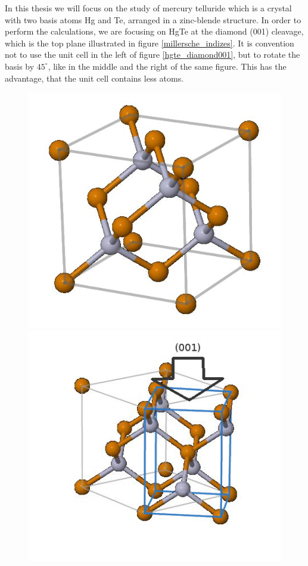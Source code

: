 	In this thesis we will focus on the study of mercury telluride which is a crystal with two basis atoms Hg and Te, arranged in a zinc-blende structure. 
	In order to perform the calculations, we are focusing on HgTe at the diamond (001) cleavage, which is the top plane illustrated in figure \ref{millersche_indizes}. It is convention not to use the unit cell in the left of figure \ref{hgte_diamond001}, but to rotate the basis by $45^{\circ}$, like in the middle and the right of the same figure. This has the advantage, that the unit cell contains less atoms. 
	\begin{figure}[h!]
		\begin{minipage}[c]{.32\linewidth}
			\centering
			\includegraphics[width=0.9\linewidth]{andere_bilder/zinc_blende.jpg}
		\end{minipage}
		\hfill
		\begin{minipage}[c]{.32\linewidth}
			\centering
			\includegraphics[width=\linewidth]{andere_bilder/zinc_blende_45degree.jpg}

\end{minipage}
\end{figure}

